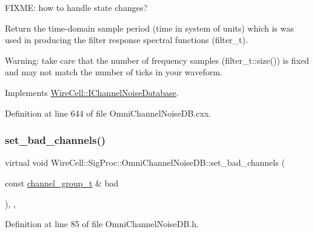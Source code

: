 F\+I\+X\+ME\+: how to handle state changes? 

Return the time-\/domain sample period (time in system of units) which is was used in producing the filter response spectral functions (filter\+\_\+t).

Warning\+: take care that the number of frequency samples (filter\+\_\+t\+::size()) is fixed and may not match the number of ticks in your waveform. 

Implements \hyperlink{class_wire_cell_1_1_i_channel_noise_database_a82406ba30d65412db34e038e789be95c}{Wire\+Cell\+::\+I\+Channel\+Noise\+Database}.



Definition at line 644 of file Omni\+Channel\+Noise\+D\+B.\+cxx.

\mbox{\label{class_wire_cell_1_1_sig_proc_1_1_omni_channel_noise_d_b_a42c1e7613ec776da66d7f30238128ce7}} 
\subsubsection{\texorpdfstring{set\+\_\+bad\+\_\+channels()}{set\_bad\_channels()}}
{\footnotesize\ttfamily virtual void Wire\+Cell\+::\+Sig\+Proc\+::\+Omni\+Channel\+Noise\+D\+B\+::set\+\_\+bad\+\_\+channels (\begin{DoxyParamCaption}\item[{const \hyperlink{class_wire_cell_1_1_i_channel_noise_database_a7fedd6ab67ba4e7eeb8cf182cc9dc6b1}{channel\+\_\+group\+\_\+t} \&}]{bad }\end{DoxyParamCaption})\hspace{0.3cm}{\ttfamily [inline]}, {\ttfamily [protected]}, {\ttfamily [virtual]}}



Definition at line 85 of file Omni\+Channel\+Noise\+D\+B.\+h.

